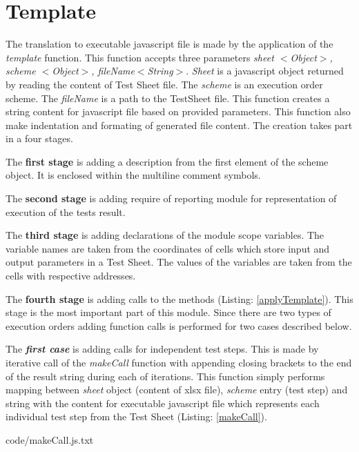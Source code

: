 \section{Template}
\label{sec:template}
The translation to executable javascript file is made by the application of the \textit{template} function. This function accepts three parameters \textit{sheet $<$Object$>$, scheme $<$Object$>$, fileName$<$String$>$}. \textit{Sheet} is a javascript object returned by reading the content of Test Sheet file. The \textit{scheme} is an execution order scheme. The \textit{fileName} is a path to the TestSheet file. This function creates a string content for javascript file based on provided parameters. This function also make indentation and formating of generated file content. The creation takes part in a four stages. 


The \textbf{first stage} is adding a description from the first element of the scheme object. It is enclosed within the multiline comment symbols.


The \textbf{second stage} is adding require of reporting module for representation of execution of the tests result.


The \textbf{third stage} is adding declarations of the module scope variables. The variable names are taken from the coordinates of cells which store input and output parameters in a Test Sheet. The values of the variables are taken from the cells with respective addresses.


The \textbf{fourth stage} is adding calls to the methods (Listing: \ref{applyTemplate}). This stage is the most important part of this module. Since there are two types of execution orders adding function calls is performed for two cases described below. 


The \textit{\textbf{first case}} is adding calls for independent test steps. This is made by iterative call of the \textit{makeCall} function with appending closing brackets to the end of the result string during each of iterations. This function simply performs mapping between \textit{sheet} object (content of xlsx file), \textit{scheme} entry (test step) and string with the content for executable javascript file which represents each individual test step from the Test Sheet (Listing: \ref{makeCall}).


{code/makeCall.js.txt}

